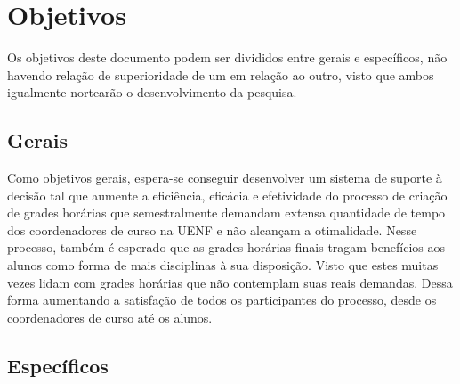 
\section{Objetivos} %

    Os objetivos deste documento podem ser divididos entre gerais e específicos, não havendo relação de superioridade de um em relação ao outro, visto que ambos igualmente nortearão o desenvolvimento da pesquisa.

    \subsection{Gerais} %


        Como objetivos gerais, espera-se conseguir desenvolver um sistema de suporte à decisão tal que aumente a eficiência, eficácia e efetividade do processo de criação de grades horárias que semestralmente demandam extensa quantidade de tempo dos coordenadores de curso na UENF e não alcançam a otimalidade. Nesse processo, também é esperado que as grades horárias finais tragam benefícios aos alunos como forma de mais disciplinas à sua disposição. Visto que estes muitas vezes lidam com grades horárias que não contemplam suas reais demandas. Dessa forma aumentando a satisfação de todos os participantes do processo, desde os coordenadores de curso até os alunos.

    \subsection{Específicos} %

